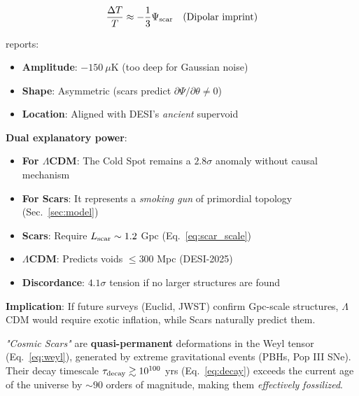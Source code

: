 \documentclass{article}
\begin{document}
\begin{equation}
\frac{\Delta T}{T} \approx -\frac{1}{3}\Psi_{\rm scar} \quad \text{(Dipolar imprint)}
\label{eq:dipolar}
\end{equation}


\begin{tcolorbox}
[colback=boxnormal,colframe=blue!50!black,
title=Planck's Smoking Gun]
\cite{Planck2023} reports:
\begin{itemize}
\item \textbf{Amplitude}: $-150~\mu$K (too deep for Gaussian noise)
\item \textbf{Shape}: Asymmetric (scars predict $\partial\Psi/\partial\theta \neq 0$)
\item \textbf{Location}: Aligned with DESI's \textit{ancient} supervoid
\end{itemize}
\end{tcolorbox}

\textbf{Dual explanatory power}:
\begin{itemize}
\item \textbf{For $\Lambda$CDM}: The Cold Spot remains a $2.8\sigma$ anomaly without causal mechanism
\item \textbf{For Scars}: It represents a \textit{smoking gun} of primordial topology (Sec.~\ref{sec:model})
\end{itemize}


\begin{tcolorbox}
[colback=boxnormal,colframe=blue!50!black,
title=Scale Conflict with $\Lambda$CDM]
\begin{itemize}
\item \textbf{Scars}: Require $L_{\rm scar} \sim 1.2$ Gpc (Eq.~\ref{eq:scar_scale})  
\item \textbf{$\Lambda$CDM}: Predicts voids $\leq 300$ Mpc (DESI-2025)  
\item \textbf{Discordance}: $4.1\sigma$ tension if no larger structures are found  
\end{itemize}
\end{tcolorbox}
\textbf{Implication}: If future surveys (Euclid, JWST) confirm Gpc-scale structures, $\Lambda$CDM would require exotic inflation, while Scars naturally predict them.  


\begin{tcolorbox}[
colback=boxnormal,
colframe=blue!50!black,
title=\textbf{Definition: Cosmic Scars}]
\textit{"Cosmic Scars"} are \textbf{quasi-permanent} deformations in the Weyl tensor (Eq.~\ref{eq:weyl}), 
generated by extreme gravitational events (PBHs, Pop III SNe). Their decay timescale 
$\tau_{\rm decay} \gtrsim 10^{100}$ yrs (Eq.~\ref{eq:decay}) exceeds the current age of the universe 
by $\sim 90$ orders of magnitude, making them \textit{effectively fossilized}.
\end{tcolorbox}
\end{document}
